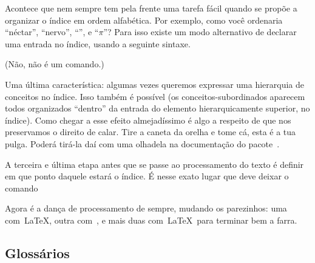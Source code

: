Acontece que  nem sempre tem pela frente uma
tarefa fácil quando se propõe a organizar o índice em ordem
alfabética. Por exemplo, como você ordenaria ``néctar'', ``nervo'',
``'', e ``$\pi$''? Para isso existe um modo
alternativo de declarar uma entrada no índice, usando a
seguinte sintaxe.

\begin{center}
\end{center}

(Não,  não é um comando.)

Uma última característica: algumas vezes queremos expressar uma
hierarquia de conceitos no índice. Isso também é possível (os
conceitos-subordinados aparecem todos organizados ``dentro'' da
entrada do elemento hierarquicamente superior, no índice). Como chegar
a esse efeito almejadíssimo é algo a respeito de que nos preservamos o
direito de calar. Tire a caneta da orelha e tome cá, esta é a tua
pulga. Poderá tirá-la daí com uma olhadela na documentação do
pacote~.

A terceira e última etapa antes que se passe ao processamento do texto
é definir em que ponto daquele estará o índice. É nesse exato lugar
que deve deixar o comando

\begin{center}
\end{center}

Agora é a dança de processamento de sempre, mudando os parezinhos: uma
com~\LaTeX, outra com~\programa, e mais duas com~\LaTeX\ para terminar
bem a farra.

\subsection{Glossários}

